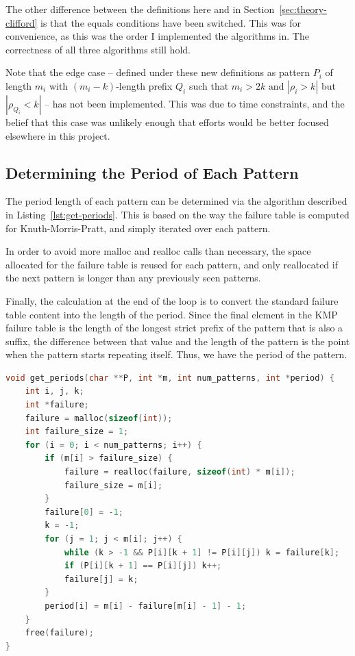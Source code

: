 \documentclass[ %
                    author={Dominic Joseph Moylett},
                    degree={MEng},
                     title={Dictionary Matching with Fingerprints},
                  subtitle={An Empirical Analysis},
                      type={research},
                      year={2015} ]{dissertation}
\begin{document}
The other difference between the definitions here and in Section~\ref{sec:theory-clifford} is that the equals conditions have been switched. This was for convenience, as this was the order I implemented the algorithms in. The correctness of all three algorithms still hold.

Note that the edge case -- defined under these new definitions as pattern $P_i$ of length $m_i$ with $(m_i - k)$-length prefix $Q_i$ such that $m_i > 2k \text{ and } |\rho_i > k|$ but $|\rho_{Q_i} < k|$ -- has not been implemented. This was due to time constraints, and the belief that this case was unlikely enough that efforts would be better focused elsewhere in this project.

\subsection{Determining the Period of Each Pattern}

The period length of each pattern can be determined via the algorithm described in Listing~\ref{lst:get-periods}. This is based on the way the failure table is computed for Knuth-Morris-Pratt, and simply iterated over each pattern.

In order to avoid more malloc and realloc calls than necessary, the space allocated for the failure table is reused for each pattern, and only reallocated if the next pattern is longer than any previously seen patterns.

Finally, the calculation at the end of the loop is to convert the standard failure table content into the length of the period. Since the final element in the KMP failure table is the length of the longest strict prefix of the pattern that is also a suffix, the difference between that value and the length of the pattern is the point when the pattern starts repeating itself. Thus, we have the period of the pattern.

\begin{lstlisting}[float={t},caption={Computing the period length $|\rho_i|$ for each pattern.},label={lst:get-periods},language=C]
void get_periods(char **P, int *m, int num_patterns, int *period) {
    int i, j, k;
    int *failure;
    failure = malloc(sizeof(int));
    int failure_size = 1;
    for (i = 0; i < num_patterns; i++) {
        if (m[i] > failure_size) {
            failure = realloc(failure, sizeof(int) * m[i]);
            failure_size = m[i];
        }
        failure[0] = -1;
        k = -1;
        for (j = 1; j < m[i]; j++) {
            while (k > -1 && P[i][k + 1] != P[i][j]) k = failure[k];
            if (P[i][k + 1] == P[i][j]) k++;
            failure[j] = k;
        }
        period[i] = m[i] - failure[m[i] - 1] - 1;
    }
    free(failure);
}
\end{lstlisting}
\end{document}
